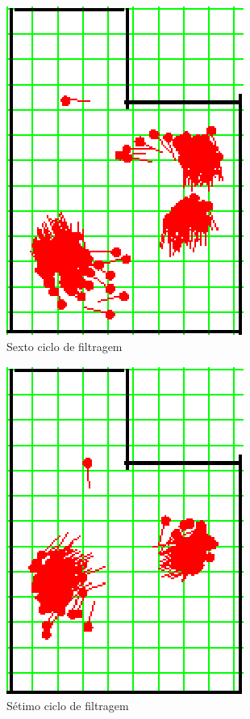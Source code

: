 \begin{figure}[H]
  \centering
  \includegraphics[scale=0.6]{figuras/cen1_ex3/7.eps}
  \caption[Sexto Ciclo de Filtragem]{Sexto ciclo de filtragem}
  \label{img:cen1_ex3_7}
\end{figure}

\begin{figure}[H]
  \centering
  \includegraphics[scale=0.6]{figuras/cen1_ex3/8.eps}
  \caption[Sétimo Ciclo de Filtragem]{Sétimo ciclo de filtragem}
  \label{img:cen1_ex3_8}
\end{figure}

